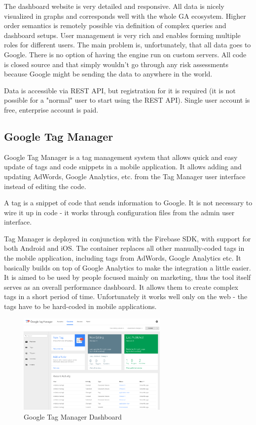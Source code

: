 The dashboard website is very detailed and responsive. All data is nicely visualized in graphs and corresponds well with the whole GA ecosystem. Higher order semantics is remotely possible via definition of complex queries and dashboard setups. User management is very rich and enables forming multiple roles for different users. The main problem is, unfortunately, that all data goes to Google. There is no option of having the engine run on custom servers. All code is closed source and that simply wouldn't go through any risk assessments because Google might be sending the data to anywhere in the world.

Data is accessible via REST API, but registration for it is required (it is not possible for a "normal" user to start using the REST API). Single user account is free, enterprise account is paid.

\subsection{Google Tag Manager}

Google Tag Manager is a tag management system that allows quick and easy update of tags and code snippets in a mobile application. It allows adding and updating AdWords, Google Analytics, etc. from the Tag Manager user interface instead of editing the code.

A tag is a snippet of code that sends information to Google. It is not necessary to wire it up in code - it works through configuration files from the admin user interface.

Tag Manager is deployed in conjunction with the Firebase SDK, with support for both Android and iOS. The container replaces all other manually-coded tags in the mobile application, including tags from AdWords, Google Analytics etc. It basically builds on top of Google Analytics to make the integration a little easier. It is aimed to be used by people focused mainly on marketing, thus the tool itself serves as an overall performance dashboard. It allows them to create complex tags in a short period of time. Unfortunately it works well only on the web - the tags have to be hard-coded in mobile applications.

\begin{figure}[!ht]
	\centering
	\includegraphics[width=0.65\textwidth]{figures/tagmanager}
    \caption{Google Tag Manager Dashboard}
\end{figure}

